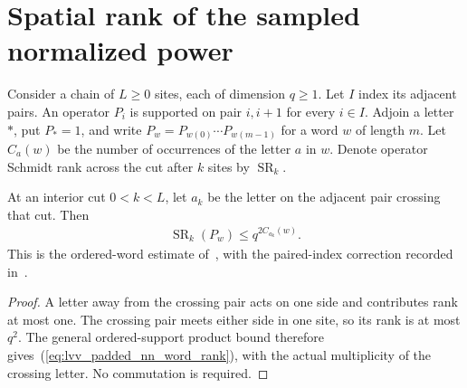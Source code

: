 \section{Spatial rank of the sampled normalized power}
\label{sec:lvv_sampled_power_rank}

Consider a chain of $L\ge0$ sites, each of dimension $q\ge1$.
Let $I$ index its adjacent pairs. An operator $P_i$ is supported on pair
$i,i+1$ for every $i\in I$. Adjoin a letter $\ast$, put $P_\ast=1$, and
write $P_w=P_{w(0)}\cdots P_{w(m-1)}$ for a word $w$ of length $m$.
Let $C_a(w)$ be the number of occurrences of the letter $a$ in $w$.
Denote operator Schmidt rank across the cut after $k$ sites by
$\operatorname{SR}_k$.

\begin{lemma}
    \label{thm:lvv_padded_nn_word_rank}
    \leanok
    At an interior cut $0<k<L$, let $a_k$ be the letter on the adjacent
    pair crossing that cut. Then
    \begin{align}
        \operatorname{SR}_k(P_w)\le q^{2C_{a_k}(w)}.
        \label{eq:lvv_padded_nn_word_rank}
    \end{align}
    This is the ordered-word estimate of~\cite[Section~2.3.1]{Landau2015Polynomial}, with the paired-index correction
    recorded in~\cite{gap:lvv13_paired_matrix_decomposition}.
\end{lemma}
\begin{proof}\leanok
    A letter away from the crossing pair acts on one side and contributes
    rank at most one. The crossing pair meets either side in one site,
    so its rank is at most $q^2$. The general ordered-support product bound
    therefore gives~(\ref{eq:lvv_padded_nn_word_rank}), with the actual
    multiplicity of the crossing letter. No commutation is required.
\end{proof}

